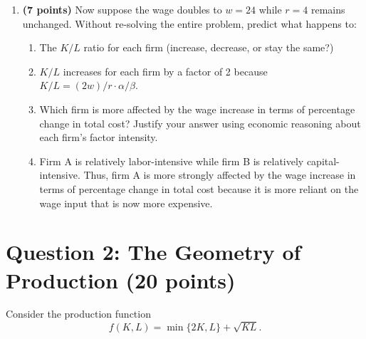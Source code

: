 \documentclass[11pt]{article}
\begin{document}
\begin{enumerate}[label=(\alph*)]
    \item \textbf{(7 points)} Now suppose the wage doubles to $w = 24$ while $r = 4$ remains unchanged. Without re-solving the entire problem, predict what happens to:
    \begin{enumerate}[label=(\roman*)]
        \item The $K/L$ ratio for each firm (increase, decrease, or stay the same?)
        \item[] $K/L$ increases for each firm by a factor of 2 because $K/L=(2w)/r\cdot\alpha/\beta$.
        \item Which firm is more affected by the wage increase in terms of percentage change in total cost? Justify your answer using economic reasoning about each firm’s factor intensity.
        \item[] Firm A is relatively labor-intensive while firm B is relatively capital-intensive. Thus, firm A is more strongly affected by the wage increase in terms of percentage change in total cost because it is more reliant on the wage input that is now more expensive.
    \end{enumerate}
\end{enumerate}

\section*{Question 2: The Geometry of Production (20 points)}

Consider the production function
\[
f(K,L) = \min\{2K, L\} + \sqrt{KL}.
\]
\end{document}

